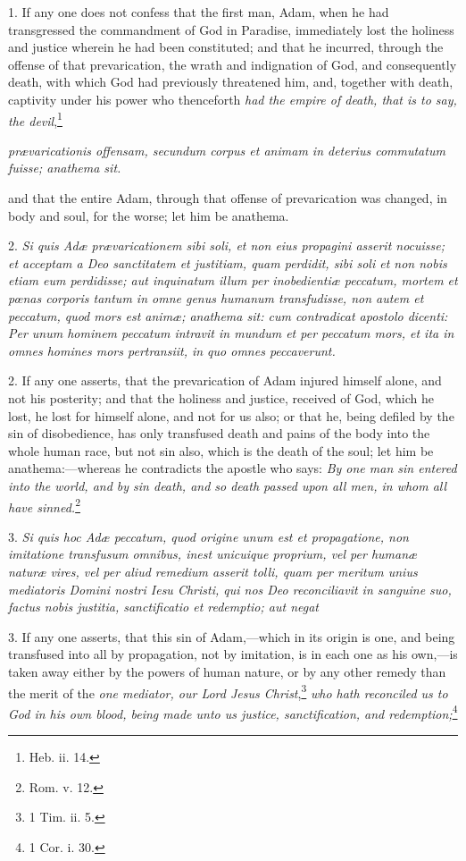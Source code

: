 1. If any one does not confess that the first man, Adam, when he had transgressed the commandment of God in Paradise, immediately lost the holiness and justice wherein he had been constituted; and that he incurred, through the offense of that prevarication, the wrath and indignation of God, and consequently death, with which God had previously threatened him, and, together with death, captivity under his power who thenceforth \emph{had the empire of death, that is to say, the devil},\footnote{\par   Heb. ii. 14.}

\emph{prævaricationis offensam, secundum corpus et animam in deterius commutatum fuisse; anathema sit.}

and that the entire Adam, through that offense of prevarication was changed, in body and soul, for the worse; let him be anathema.

2. \emph{Si quis Adæ prævaricationem sibi soli, et non eius propagini asserit nocuisse; et acceptam a Deo sanctitatem et justitiam, quam perdidit, sibi soli et non nobis etiam eum perdidisse; aut inquinatum illum per inobedientiæ peccatum, mortem et pœnas corporis tantum in omne genus humanum transfudisse, non autem et peccatum, quod mors est animæ; anathema sit: cum contradicat apostolo dicenti: Per unum hominem peccatum intravit in mundum et per peccatum mors, et ita in omnes homines mors pertransiit, in quo omnes peccaverunt.}

2. If any one asserts, that the prevarication of Adam injured himself alone, and not his posterity; and that the holiness and justice, received of God, which he lost, he lost for himself alone, and not for us also; or that he, being defiled by the sin of disobedience, has only transfused death and pains of the body into the whole human race, but not sin also, which is the death of the soul; let him be anathema:—whereas he contradicts the apostle who says: \emph{By one man sin entered into the world, and by sin death, and so death passed upon all men, in whom all have sinned.}\footnote{\par   Rom. v. 12.}

3. \emph{Si quis hoc Adæ peccatum, quod origine unum est et propagatione, non imitatione transfusum omnibus, inest unicuique proprium, vel per humanæ naturæ vires, vel per aliud remedium asserit tolli, quam per meritum unius mediatoris Domini nostri Iesu Christi, qui nos Deo reconciliavit in sanguine suo, factus nobis justitia, sanctificatio et redemptio; aut negat}

3. If any one asserts, that this sin of Adam,—which in its origin is one, and being transfused into all by propagation, not by imitation, is in each one as his own,—is taken away either by the powers of human nature, or by any other remedy than the merit of the \emph{one mediator, our Lord Jesus Christ},\footnote{\par   1 Tim. ii. 5.} \emph{who hath reconciled us to God in his own blood, being made unto us justice, sanctification, and redemption;}\footnote{\par   1 Cor. i. 30.}

